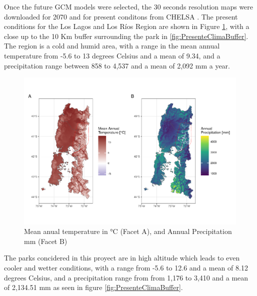 \documentclass[]{article}
\begin{document}
Once the future GCM models were selected, the 30 seconds resolution maps were downloaded for 2070 and for present conditons from CHELSA \citep{karger2020high}.
The present conditions for the Los Lagos and Los Ríos Region are shown in Figure \ref{fig:PresenteClima}, with a close up to the 10 Km buffer surrounding the park in \ref{fig:PresenteClimaBuffer}. The region is a cold and humid area, with a range in the mean annual temperature from -5.6 to 13 degrees Celsius and a mean of 9.34, and a precipitation range between 858 to 4,537 and a mean of 2,092 mm a year.

\begin{figure}
\includegraphics[width=1\linewidth,height=1\textheight]{Review_and_climate_files/figure-latex/PresenteClima-1} \caption{Mean anual temperature in °C (Facet A), and Annual Precipitation mm (Facet B)}\label{fig:PresenteClima}
\end{figure}

The parks concidered in this proyect are in high altitude which leads to even cooler and wetter conditions, with a range from -5.6 to 12.6 and a mean of 8.12 degrees Celsius, and a precipitation range from from 1,176 to 3,410 and a mean of 2,134.51 mm as seen in figure \ref{fig:PresenteClimaBuffer}.
\end{document}
